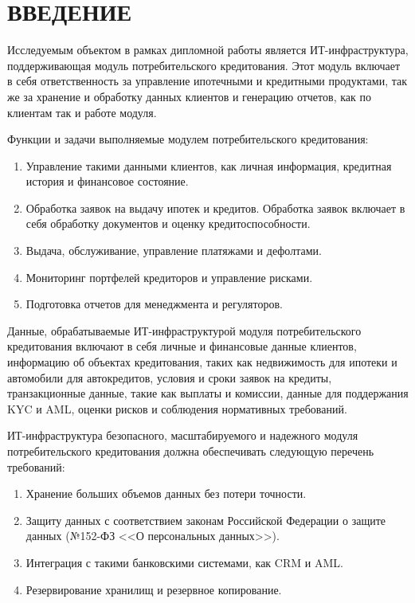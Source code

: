\documentclass[14pt, a4paper]{extarticle}
\begin{document}
\def\contentsname{СОДЕРЖАНИЕ}

%  
%  
\setcounter{page}{4}
\tableofcontents

\section*{ВВЕДЕНИЕ}
{}

Исследуемым объектом в рамках дипломной работы является ИТ-инфраструктура,
поддерживающая модуль потребительского кредитования. Этот модуль включает в
себя ответственность за управление ипотечными и кредитными продуктами, так же
за хранение и обработку данных клиентов и генерацию отчетов, как по клиентам
так и работе модуля.

Функции и задачи выполняемые модулем потребительского кредитования:
\begin{enumerate}
	\item Управление такими данными клиентов, как личная информация, кредитная
история и финансовое состояние.
	\item Обработка заявок на выдачу ипотек и кредитов. Обработка заявок включает
в себя обработку документов и оценку кредитоспособности.
	\item Выдача, обслуживание, управление платяжами и дефолтами.
	\item Мониторинг портфелей кредиторов и управление рисками.
	\item Подготовка отчетов для менеджмента и регуляторов.
\end{enumerate}

Данные, обрабатываемые ИТ-инфраструктурой модуля потребительского кредитования
включают в себя личные и финансовые данные клиентов, информацию об объектах
кредитования, таких как недвижимость для ипотеки и автомобили для автокредитов,
условия и сроки заявок на кредиты, транзакционные данные, такие как выплаты и
комиссии, данные для поддержания KYC и AML, оценки рисков и соблюдения
нормативных требований.

ИТ-инфраструктура безопасного, масштабируемого и надежного модуля
потребительского кредитования должна обеспечивать следующую перечень
требований:

\begin{enumerate}
	\item Хранение больших объемов данных без потери точности.
	\item Защиту данных с соответствием законам Российской Федерации о защите
данных (№152-ФЗ <<О персональных данных>>).
	\item Интеграция с такими банковскими системами, как CRM и AML.
	\item Резервирование хранилищ и резервное копирование.
\end{enumerate}
\end{document}
